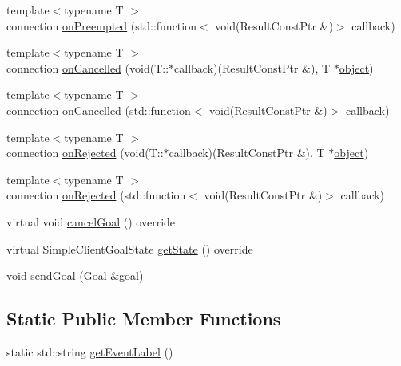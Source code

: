\begin{DoxyCompactItemize}
{\footnotesize template$<$typename T $>$ }\\connection \hyperlink{classsmacc_1_1SmaccActionClientBase_ab1f136064ef934192ef83346fe665d02}{on\+Preempted} (std\+::function$<$ void(Result\+Const\+Ptr \&)$>$ callback)
\item 
{\footnotesize template$<$typename T $>$ }\\connection \hyperlink{classsmacc_1_1SmaccActionClientBase_af745f6c891cf386e4d5609ef6405c9b2}{on\+Cancelled} (void(T\+::$\ast$callback)(Result\+Const\+Ptr \&), T $\ast$\hyperlink{classobject}{object})
\item 
{\footnotesize template$<$typename T $>$ }\\connection \hyperlink{classsmacc_1_1SmaccActionClientBase_a9703eb07313b31f760b0374a54de4193}{on\+Cancelled} (std\+::function$<$ void(Result\+Const\+Ptr \&)$>$ callback)
\item 
{\footnotesize template$<$typename T $>$ }\\connection \hyperlink{classsmacc_1_1SmaccActionClientBase_abe5bbda2edcfe851d41868250dfabde4}{on\+Rejected} (void(T\+::$\ast$callback)(Result\+Const\+Ptr \&), T $\ast$\hyperlink{classobject}{object})
\item 
{\footnotesize template$<$typename T $>$ }\\connection \hyperlink{classsmacc_1_1SmaccActionClientBase_aca79d34dfacbf4de54a2f60d7789a872}{on\+Rejected} (std\+::function$<$ void(Result\+Const\+Ptr \&)$>$ callback)
\item 
virtual void \hyperlink{classsmacc_1_1SmaccActionClientBase_a3d5f2229c16bb64a41bf05087fe8a0c0}{cancel\+Goal} () override
\item 
virtual Simple\+Client\+Goal\+State \hyperlink{classsmacc_1_1SmaccActionClientBase_a8d38923b01df38b46099e8ba06f7ff7c}{get\+State} () override
\item 
void \hyperlink{classsmacc_1_1SmaccActionClientBase_a2ec9e5fb96ecc517a815cda209eb1b51}{send\+Goal} (Goal \&goal)
\end{DoxyCompactItemize}
\subsection*{Static Public Member Functions}
\begin{DoxyCompactItemize}
\item 
static std\+::string \hyperlink{classsmacc_1_1SmaccActionClientBase_a3f925bb2c5cfe0dc7937ad7da755209a}{get\+Event\+Label} ()
\end{DoxyCompactItemize}
